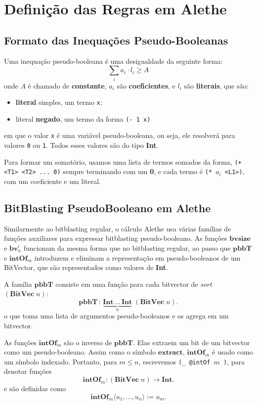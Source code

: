 \documentclass[conference]{IEEEtran}
\begin{document}
\section{Definição das Regras em Alethe}
\subsection{Formato das Inequações Pseudo-Booleanas}
Uma inequação pseudo-booleana é uma desigualdade da seguinte forma:
\[
    \sum_i a_i \cdot l_i \geq A
\]
onde $A$ é chamado de \textbf{constante}, $a_i$ são \textbf{coeficientes},
e $l_i$ são \textbf{literais}, que são:
\begin{itemize}
    \item \textbf{literal} simples, um termo \texttt{x};
    \item literal \textbf{negado}, um termo da forma \texttt{(- 1 x)}
\end{itemize}

em que o valor \texttt{x} é uma variável pseudo-booleana, ou seja, ele resolverá para valores
\texttt{0} ou \texttt{1}. Todos esses valores são do tipo \textbf{Int}.

Para formar um somatório, usamos uma lista de termos somados da forma,
\texttt{(+ <T1> <T2> ... 0)} sempre terminando com um \textbf{0}, e cada termo é
\texttt{(* $a_i$ <L1>)}, com um coeficiente e um literal.

\subsection{BitBlasting PseudoBooleano em Alethe}
Similarmente ao bitblasting regular, o cálculo Alethe usa várias famílias de funções auxiliares
para expressar bitblasting pseudo-booleano.
As funções $\textbf{bvsize}$ e $\textbf{bv}_n^i$ funcionam da mesma forma que no bitblasting regular,
ao passo que $\textbf{pbbT}$ e $\textbf{intOf}_m$ introduzem e eliminam a representação em
pseudo-booleanos de um BitVector, que são representados como valores de \textbf{Int}.

A família $\textbf{pbbT}$ consiste em uma função para cada bitvector de \textit{sort} $(\textbf{BitVec}\;n)$:
\[
    \textbf{pbbT}\,:\,\underbrace{\textbf{Int}\,\dots\,\textbf{Int}}_n\;(\textbf{BitVec}\;n).
\]
o que toma uma lista de argumentos pseudo-booleanos e os agrega em um bitvector.

As funções $\textbf{intOf}_m$ são o inverso de $\textbf{pbbT}$. Elas extraem
um bit de um bitvector como um pseudo-booleano. Assim como o símbolo $\textbf{extract}$,
$\textbf{intOf}_m$ é usado como um símbolo indexado. Portanto, para $m \leq n$,
escrevemos \texttt{(\_ @intOf $m$ )}, para denotar funções
\[
    \textbf{intOf}_m : (\textbf{BitVec}\;n) \to \textbf{Int}.
\]
e são definidas como
\[
    \textbf{intOf}_m \langle u_1, \dots, u_n \rangle := u_m.
\]
\end{document}

